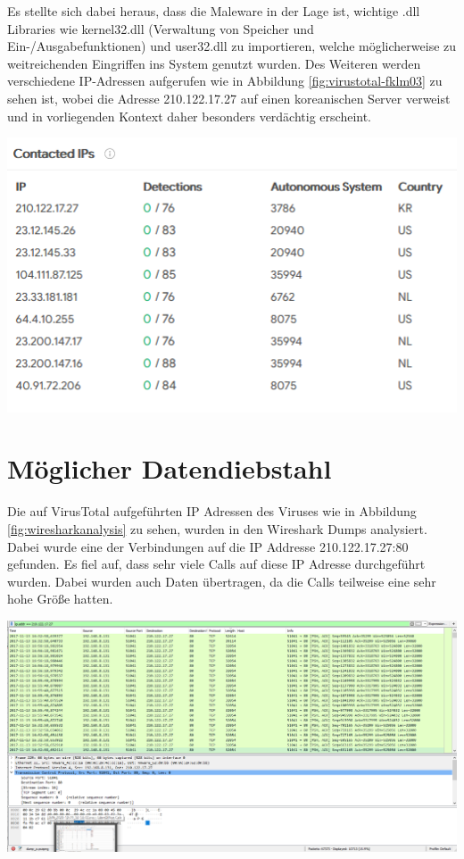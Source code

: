 Es stellte sich dabei heraus, dass die Maleware in der Lage ist, wichtige .dll Libraries wie kernel32.dll (Verwaltung von Speicher und  Ein-/Ausgabefunktionen) und user32.dll zu importieren, welche möglicherweise zu weitreichenden Eingriffen ins System genutzt wurden.
Des Weiteren werden verschiedene IP-Adressen aufgerufen wie in Abbildung \ref{fig:virustotal-fklm03} zu sehen ist, wobei die Adresse 210.122.17.27 auf einen koreanischen Server verweist und in vorliegenden Kontext daher besonders verdächtig erscheint.

\begin{center}
	\includegraphics[width=15.8cm]{figures/virustotal-fklm03.PNG}
	\label{fig:virustotal-fklm03}
\end{center}



\chapter{Möglicher Datendiebstahl}
Die auf VirusTotal aufgeführten IP Adressen des Viruses wie in Abbildung \ref{fig:wiresharkanalysis} zu sehen, wurden in den Wireshark Dumps analysiert. Dabei wurde eine der Verbindungen auf die IP Addresse 210.122.17.27:80 gefunden. Es fiel auf, dass sehr viele Calls auf diese IP Adresse durchgeführt wurden. Dabei wurden auch Daten übertragen, da die Calls teilweise eine sehr hohe Größe hatten.

\begin{center}
	\includegraphics[width=15.8cm]{figures/wiresharkanalysis}
	\label{fig:wiresharkanalysis}
\end{center}

